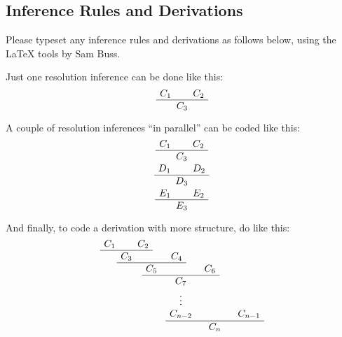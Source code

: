 \subsection{Inference Rules and Derivations}

Please typeset any inference rules and derivations as
follows below, using the
\LaTeX{} tools by Sam Buss.

Just one resolution inference can be done like this:
\begin{equation}
  \AxiomC{$C_1$}
  \AxiomC{$C_2$}
  \BinaryInfC{$C_3$}
  \DisplayProof  
\end{equation}

A couple of resolution inferences ``in parallel'' can be coded like
this:
\begin{gather}
  \AxiomC{$C_1$}
  \AxiomC{$C_2$}
  \BinaryInfC{$C_3$}
  \DisplayProof  
  \\
  \AxiomC{$D_1$}
  \AxiomC{$D_2$}
  \BinaryInfC{$D_3$}
  \DisplayProof  
  \\
  \AxiomC{$E_1$}
  \AxiomC{$E_2$}
  \BinaryInfC{$E_3$}
  \DisplayProof  
\end{gather}
    
And finally, 
to code a derivation with more structure, do like this:
\begin{equation}
  \AxiomC{$C_1$}
  \AxiomC{$C_2$}
  \BinaryInfC{$C_3$}
  \AxiomC{$C_4$}
  \BinaryInfC{$C_5$}
  \AxiomC{$C_6$}
  \BinaryInfC{$C_7$}
  \noLine
  \UnaryInfC{$\vdots$}
  \noLine
  \UnaryInfC{$C_{n-2}$}
  \AxiomC{$C_{n-1}$}
  \BinaryInfC{$C_n$}
  \DisplayProof  
\end{equation}


